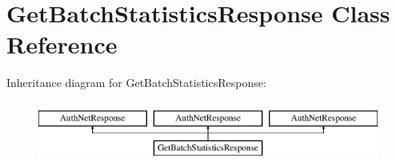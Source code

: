 \hypertarget{interface_get_batch_statistics_response}{
\section{GetBatchStatisticsResponse Class Reference}
\label{interface_get_batch_statistics_response}
}
Inheritance diagram for GetBatchStatisticsResponse:\begin{figure}[H]
\begin{center}
\leavevmode
\includegraphics[height=2.000000cm]{interface_get_batch_statistics_response}
\end{center}
\end{figure}
